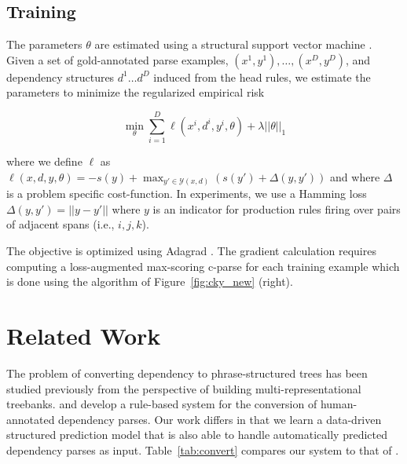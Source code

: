 \documentclass[11pt,letterpaper]{article}
\begin{document}
\subsection{Training}

The parameters $\theta$ are estimated using a structural support
vector machine \cite{taskar-04}.
Given a set of gold-annotated parse examples, $(x^{1}, y^{1}), \ldots,
(x^{D}, y^{D})$, and dependency structures $d^{1} \ldots d^{D}$ induced
from the head rules, we estimate the
parameters to minimize the regularized empirical risk

\[ \min_{\theta} \sum_{i = 1}^D  \ell( x^{i}, d^{i} , y^{i}, \theta)  + \lambda ||\theta||_1 \]

\noindent where we define $\ell$ as
$\ell(x, d, y, \theta) = - s(y) + \max_{y' \in \mathcal{Y}(x, d)}\left(s(y')  + \Delta(y, y') \right) $
\noindent and where $\Delta$ is a problem specific cost-function.
In experiments, we use a Hamming loss  $\Delta(y, y') = || y -y'||$
where $y$ is an indicator for production rules firing over pairs of
adjacent spans (i.e., $i, j, k$).

The objective is optimized using Adagrad \cite{duchi2011adaptive}.  The gradient
calculation requires computing a loss-augmented max-scoring c-parse for each
training example which is done using the algorithm of
Figure~\ref{fig:cky_new} (right).


\section{Related Work}

The problem of converting dependency to phrase-structured trees has
been studied previously from the perspective of building
multi-representational treebanks.   and
 develop a rule-based system for the
conversion of human-annotated dependency parses. Our work differs in that
we learn a data-driven structured prediction model that is also able
to handle automatically predicted dependency parses as input. Table~\ref{tab:convert} compares
our system to that of .
\end{document}
